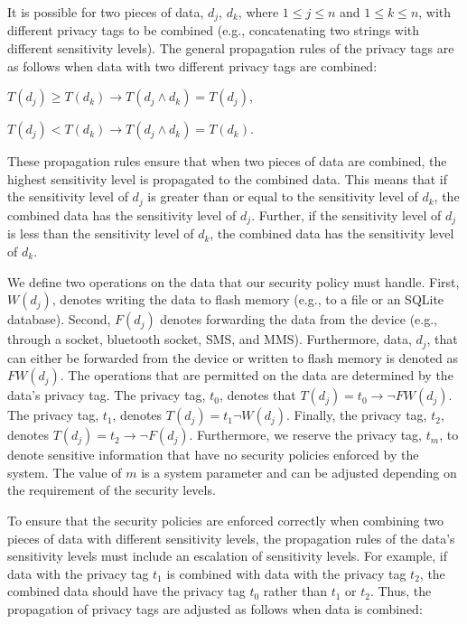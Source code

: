 It is possible for two pieces of data, $d_{j}$, $d_{k}$, where $1 \le
j \le n$ and $1 \le k \le n$,  with different privacy tags
to be combined (e.g., concatenating two strings with different
sensitivity levels).  The general propagation rules of the
privacy tags are as follows when data with two different privacy tags
are combined:

$T(d_{j}) \ge T(d_{k}) \to T(d_{j}\wedge d_{k}) = T(d_{j})$,

$T(d_{j}) < T(d_{k}) \to T(d_{j} \wedge d_{k}) = T(d_{k})$.

These propagation rules ensure that when two pieces of
data are combined, the highest sensitivity level is propagated
to the combined data.   This means that if the sensitivity
level of $d_{j}$ is greater than or equal to the sensitivity
level of $d_{k}$, the combined data has the sensitivity level
of $d_{j}$.  Further, if the sensitivity level of $d_{j}$ is
less than the sensitivity level of $d_{k}$, the combined data
has the sensitivity level of $d_{k}$.

We define two operations on the data that our security policy
must handle.  First, $W(d_{j})$, denotes writing the data to
flash memory (e.g., to a file or an SQLite database). Second,
$F(d_{j})$ denotes forwarding the data from the device
(e.g., through a socket, bluetooth socket, SMS, and MMS).
Furthermore, data, $d_{j}$, that can either be forwarded from the
device or written to flash memory is denoted as $FW\left(d_{j}\right)$.
The operations that are permitted on the data are determined by the
data's privacy tag.  The privacy tag, $t_0$, denotes
that $T(d_{j}) = t_0 \to \lnot FW\left(d_{j}\right)$. The privacy tag,
$t_1$, denotes $T(d_{j}) = t_1\lnot W\left(d_{j}\right)$.  Finally,
the privacy tag, $t_2$, denotes 
$T(d_{j}) = t_2 \to \lnot F\left(d_{j}\right)$.  Furthermore, we reserve
the privacy tag, $t_m$, to denote sensitive information that have
no security policies enforced by the system.  The value of $m$ is a
system parameter and can be adjusted depending on the requirement of
the security levels. 

To ensure that the security policies are enforced correctly when
combining two pieces of data with different sensitivity levels,
the propagation rules of the data's sensitivity levels must
include an escalation of sensitivity levels.  For example, if
data with the privacy tag $t_1$ is combined with data with
the privacy tag $t_2$, the combined data should have the
privacy tag $t_0$ rather than $t_1$ or $t_2$.  Thus, the propagation
of privacy tags are adjusted as follows when data is combined:

